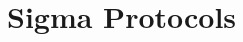 \documentclass{zkdl-template-105x135-nohead}
\begin{document}










    \section{Sigma Protocols} \label{section:sigma}

    



\end{document}
